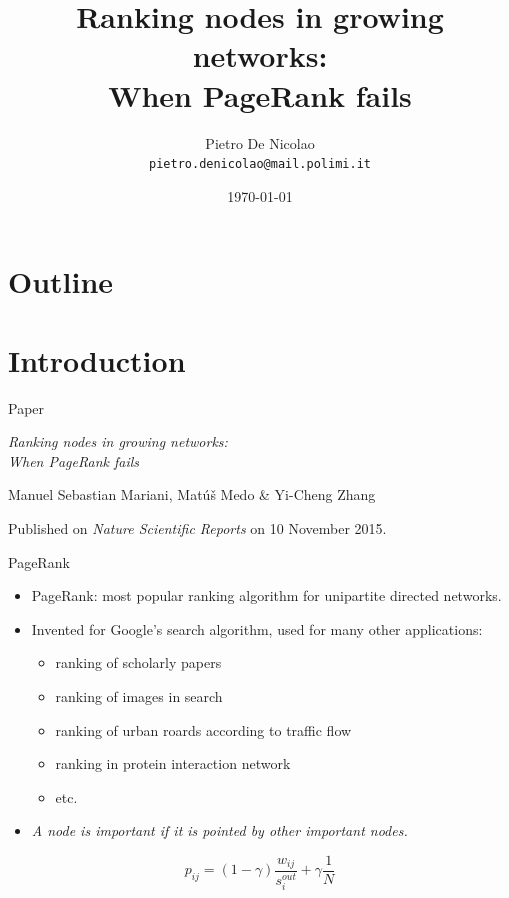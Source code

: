 \documentclass[utf8]{beamer}
\title[When PageRank fails]{Ranking nodes in growing networks: \\ When PageRank fails}
\author[De Nicolao]{Pietro De Nicolao \\ \texttt{pietro.denicolao@mail.polimi.it}}
\date{\today} %
\institute{Politecnico di Milano}
\begin{document}
\begin{frame}
    \titlepage
\end{frame}

\section*{Outline}
\begin{frame}
 \tableofcontents
\end{frame}

\section{Introduction}
\begin{frame}{Paper}
    \begin{center}
    \emph{\Large Ranking nodes in growing networks: \\ When PageRank fails}
    \end{center}

    Manuel Sebastian Mariani, Matúš Medo \& Yi-Cheng Zhang

    Published on \emph{Nature Scientific Reports} on 10 November 2015.
\end{frame}

\begin{frame}{PageRank}
    \begin{itemize}
        \item PageRank: most popular ranking algorithm for unipartite directed networks.
        \item Invented for Google's search algorithm, used for many other applications:
        \begin{itemize}
            \item ranking of scholarly papers
            \item ranking of images in search
            \item ranking of urban roards according to traffic flow
            \item ranking in protein interaction network
            \item etc.
        \end{itemize}
        \item \emph{A node is important if it is pointed by other important nodes.}
    \end{itemize}
    \[
        p_{ij} = (1-\gamma) \frac{w_{ij}}{s_i^{out}} + \gamma \frac{1}{N}
    \]
\end{frame}
\end{document}
